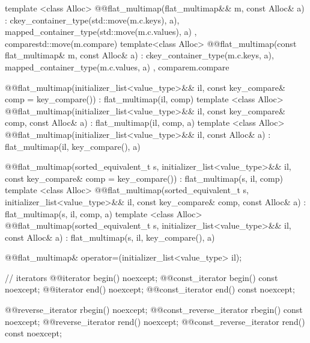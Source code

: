 \begin{codeblock}
{{    template <class Alloc>
      @@flat_multimap(flat_multimap&& m, const Alloc& a)
        : c{key_container_type(std::move(m.c.keys), a),
            mapped_container_type(std::move(m.c.values), a)}
        , compare{std::move(m.compare)}
      { }
    template<class Alloc>
      @@flat_multimap(const flat_multimap& m, const Alloc& a)
        : c{key_container_type(m.c.keys, a), mapped_container_type(m.c.values, a)}
        , compare{m.compare}
      { }

    @@flat_multimap(initializer_list<value_type>&& il,
                            const key_compare& comp = key_compare())
        : flat_multimap(il, comp) { }
    template <class Alloc>
      @@flat_multimap(initializer_list<value_type>&& il,
                              const key_compare& comp, const Alloc& a)
        : flat_multimap(il, comp, a) { }
    template <class Alloc>
      @@flat_multimap(initializer_list<value_type>&& il, const Alloc& a)
        : flat_multimap(il, key_compare(), a) { }

    @@flat_multimap(sorted_equivalent_t s, initializer_list<value_type>&& il,
                            const key_compare& comp = key_compare())
        : flat_multimap(s, il, comp) { }
    template <class Alloc>
      @@flat_multimap(sorted_equivalent_t s, initializer_list<value_type>&& il,
                              const key_compare& comp, const Alloc& a)
        : flat_multimap(s, il, comp, a) { }
    template <class Alloc>
      @@flat_multimap(sorted_equivalent_t s, initializer_list<value_type>&& il,
                              const Alloc& a)
        : flat_multimap(s, il, key_compare(), a) { }

    @@flat_multimap& operator=(initializer_list<value_type> il);

    // iterators
    @@iterator                begin() noexcept;
    @@const_iterator          begin() const noexcept;
    @@iterator                end() noexcept;
    @@const_iterator          end() const noexcept;

    @@reverse_iterator        rbegin() noexcept;
    @@const_reverse_iterator  rbegin() const noexcept;
    @@reverse_iterator        rend() noexcept;
    @@const_reverse_iterator  rend() const noexcept;

}}
\end{codeblock}
